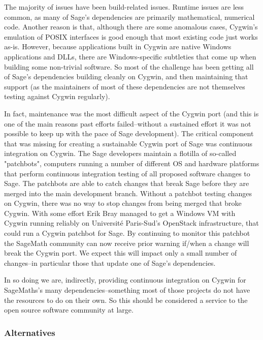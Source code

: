 The majority of issues have been build-related issues. Runtime issues
are less common, as many of Sage's dependencies are primarily
mathematical, numerical code. Another reason is that, although there are
some anomalous cases, Cygwin's emulation of POSIX interfaces is good
enough that most existing code just works as-is. However, because
applications built in Cygwin are native Windows applications and DLLs,
there are Windows-specific subtleties that come up when building some
non-trivial software. So most of the challenge has been getting all of
Sage's dependencies building cleanly on Cygwin, and then maintaining
that support (as the maintainers of most of these dependencies are not
themselves testing against Cygwin regularly).

In fact, maintenance was the most difficult aspect of the Cygwin port
(and this is one of the main reasons past efforts failed--without a
sustained effort it was not possible to keep up with the pace of Sage
development). The critical component that was missing for creating a
sustainable Cygwin port of Sage was continuous integration on Cygwin. The
Sage developers maintain a flotilla of so-called "patchbots", computers
running a number of different OS and hardware platforms that perform
continuous integration testing of all proposed software changes to Sage.
The patchbots are able to catch changes that break Sage before they are
merged into the main development branch. Without a patchbot testing
changes on Cygwin, there was no way to stop changes from being merged
that broke Cygwin. With some effort Erik Bray managed to get a Windows
VM with Cygwin running reliably on Université Paris-Sud's OpenStack
infrastructure, that could run a Cygwin patchbot for Sage. By continuing
to monitor this patchbot the SageMath community can now receive prior
warning if/when a change will break the Cygwin port. We expect this will
impact only a small number of changes--in particular those that update
one of Sage's dependencies.

In so doing we are, indirectly, providing continuous integration on
Cygwin for SageMaths's many dependencies--something most of those
projects do not have the resources to do on their own. So this should be
considered a service to the open source software community at large.

\hypertarget{alternatives}{%
\subsubsection{Alternatives}\label{alternatives}}

